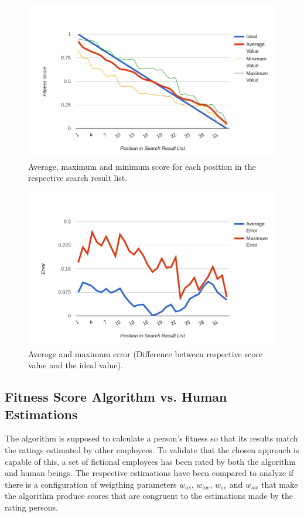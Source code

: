 \begin{figure}[H]
    \centering
    \includegraphics[width=\textwidth]{images/dist_avg.png}
    \caption[Diagram: Fitness Score Distribution (Processed)]{Average, maximum and minimum score for each position in the respective search result list.}
    \label{fig:dist-avg}
\end{figure}

\begin{figure}[H]
    \centering
    \includegraphics[width=\textwidth]{images/dist_error.png}
    \caption[Diagram: Fitness Score Distribution (Error Rates)]{Average and maximum error (Difference between respective score value and the ideal value).}
    \label{fig:dist-err}
\end{figure}

\newpage

\subsection{Fitness Score Algorithm vs. Human Estimations}
The algorithm is supposed to calculate a person's fitness so that its results match the ratings estimated by other employees. To validate that
the chosen approach is capable of this, a set of fictional employees has been rated by both the algorithm and human beings. The respective estimations have been compared to analyze if there is a configuration of weigthing parameters $w_{as}$, $w_{aw}$, $w_{ss}$ and $w_{sw}$ that make the algorithm produce scores that are
congruent to the estimations made by the rating persons.

